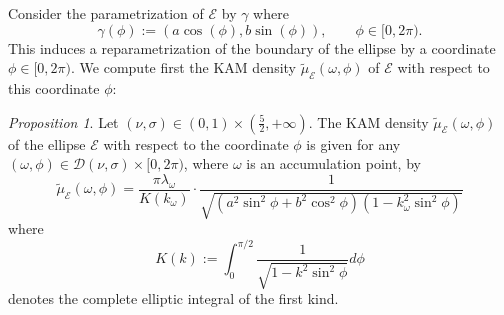 \documentclass[12pt, openany]{amsart}
\theoremstyle{definition}
\theoremstyle{remark}
\theoremstyle{remark}
\theoremstyle{theorem}
\theoremstyle{theorem}
\theoremstyle{theorem}
\newtheorem{proposition}[theorem]{Proposition}
\theoremstyle{theorem}
\begin{document}
Consider the parametrization of $\mathscr E$ by $\gamma$ where
\[
\gamma(\phi) := (a\cos(\phi),b\sin(\phi)),\qquad\phi\in[0,2\pi).
\]
This induces a reparametrization of the boundary of the ellipse by a coordinate $\phi\in[0,2\pi)$. We compute first the KAM density $\tilde\mu_{\mathscr E}(\omega,\phi)$ of $\mathscr E$ with respect to this coordinate $\phi$:

\begin{proposition}
\label{proposition:beta_ellipse}
Let $(\nu,\sigma)\in(0,1)\times(\frac{5}{2},+\infty)$.
The KAM density $\tilde\mu_{\mathscr E}(\omega,\phi)$ of the ellipse $\mathscr E$ with respect to the coordinate $\phi$  is given for any $(\omega,\phi)\in\mathcal D(\nu,\sigma)\times[0,2\pi)$, where $\omega$ is an accumulation point, by
\begin{equation}
\label{equation:beta_ellipse}
\tilde\mu_{\mathscr E}(\omega,\phi) = 
\frac{\pi\lambda_{\omega}}{K(k_{\omega})}\cdot
\frac{1}
{\sqrt{(a^2\sin^2\phi+b^2\cos^2\phi)(1-k_{\omega}^2\sin^2\phi)}}
\end{equation}
where
\[
K(k) := \int_{0}^{\pi/2}\frac{1}{\sqrt{1-k^2\sin^2\phi}}d\phi
\]
denotes the complete elliptic integral of the first kind.
\end{proposition}
\end{document}
